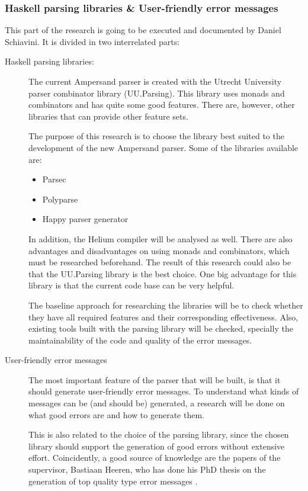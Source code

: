 \subsubsection{Haskell parsing libraries \& User-friendly error messages}
This part of the research is going to be executed and documented by Daniel Schiavini.
It is divided in two interrelated parts:
\begin{description}
	\item [Haskell parsing libraries:]
	The current Ampersand parser is created with the Utrecht University parser combinator library (UU.Parsing).
	This library uses monads and combinators and has quite some good features.
	There are, however, other libraries that can provide other feature sets.
	
	The purpose of this research is to choose the library best suited to the development of the new Ampersand parser.
	Some of the libraries available are:
	\begin{itemize}
		\item Parsec
		\item Polyparse
		\item Happy parser generator
	\end{itemize}
	In addition, the Helium compiler will be analysed as well.
	There are also advantages and disadvantages on using monads and combinators, which must be researched beforehand.
	The result of this research could also be that the UU.Parsing library is the best choice.
	One big advantage for this library is that the current code base can be very helpful.

	The baseline approach for researching the libraries will be to check whether they have all required features and their corresponding effectiveness.
	Also, existing tools built with the parsing library will be checked, specially the maintainability of the code and quality of the error messages.

	\item [User-friendly error messages]
	The most important feature of the parser that will be built, is that it should generate user-friendly error messages.
	To understand what kinds of messages can be (and should be) generated, a research will be done on what good errors are and how to generate them.
	
	This is also related to the choice of the parsing library, since the chosen library should support the generation of good errors without extensive effort.
	Coincidently, a good source of knowledge are the papers of the supervisor, Bastiaan Heeren, who has done his PhD thesis on the generation of top quality type error messages \cite{heeren-error}.
\end{description}

